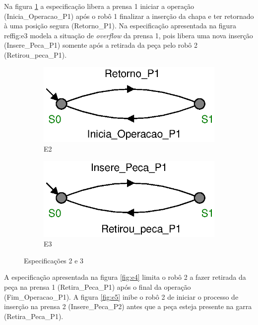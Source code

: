 Na figura \ref{fig:e2} a especificação libera a prensa 1 iniciar a operação (Inicia\_Operacao\_P1) após o robô 1 finalizar a inserção da chapa e ter retornado à uma posição segura (Retorno\_P1). Na especificação apresentada na figura ref{fig:e3} modela a situação de \textit{overflow} da prensa 1, pois libera uma nova inserção (Insere\_Peca\_P1) somente após a retirada da peça pelo robô 2 (Retirou\_peca\_P1).

\begin{figure}[H]%
  \centering
  \begin{subfigure}[b]{0.45\textwidth}
      \centering
      \includegraphics[width=\textwidth]{imagens/E2.eps}
      \caption{E2}
      \label{fig:e2}
  \end{subfigure}
  \hfill
  \begin{subfigure}[b]{0.45\textwidth}
      \centering
      \includegraphics[width=\textwidth]{imagens/E3.eps}
      \caption{E3}
      \label{fig:e3}
  \end{subfigure}
  \caption{Especificações 2 e 3}
  \label{fig:e23}
\end{figure}

A especificação apresentada na figura \ref{fig:e4} limita o robô 2 a fazer retirada da peça na prensa 1 (Retira\_Peca\_P1) após o final da operação (Fim\_Operacao\_P1). A figura \ref{fig:e5} inibe o robô 2 de iniciar o processo de inserção na prensa 2 (Insere\_Peca\_P2) antes que a peça esteja presente na garra (Retira\_Peca\_P1).

